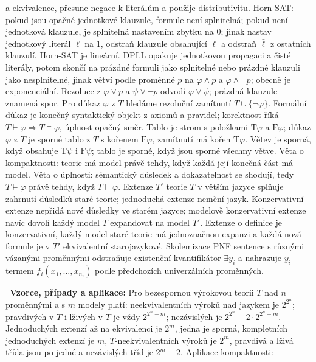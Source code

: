 \begin{odpoved}
a ekvivalence, přesune negace k literálům a použije distributivitu. Horn-SAT: pokud jsou
opačné jednotkové klauzule, formule není splnitelná; pokud není jednotková klauzule, je
splnitelná nastavením zbytku na $0$; jinak nastav jednotkový literál $\ell$ na $1$,
odstraň klauzule obsahující $\ell$ a odstraň $\bar\ell$ z ostatních klauzulí. Horn-SAT
je lineární. DPLL opakuje jednotkovou propagaci a čisté literály, potom skončí na prázdné
formuli jako splnitelné nebo prázdné klauzuli jako nesplnitelné, jinak větví podle proměnné
$p$ na $\varphi\land p$ a $\varphi\land\neg p$; obecně je exponenciální. Rezoluce z
$\varphi\lor p$ a $\psi\lor\neg p$ odvodí $\varphi\lor\psi$; prázdná klauzule znamená
spor. Pro důkaz $\varphi$ z $T$ hledáme rezoluční zamítnutí $T\cup\{\neg\varphi\}$.
Formální důkaz je konečný syntaktický objekt z axiomů a pravidel; korektnost říká
$T\vdash\varphi\Rightarrow T\models\varphi$, úplnost opačný směr. Tablo je strom s
položkami $\mathrm T\varphi$ a $\mathrm F\varphi$; důkaz $\varphi$ z $T$ je sporné
tablo z $T$ s kořenem $\mathrm F\varphi$, zamítnutí má kořen $\mathrm T\varphi$. Větev
je sporná, když obsahuje $\mathrm T\psi$ i $\mathrm F\psi$; tablo je sporné, když jsou
sporné všechny větve. Věta o kompaktnosti: teorie má model právě tehdy, když každá její
konečná část má model. Věta o úplnosti: sémantický důsledek a dokazatelnost se shodují,
tedy $T\models\varphi$ právě tehdy, když $T\vdash\varphi$. Extenze $T'$ teorie $T$ v
větším jazyce splňuje zahrnutí důsledků staré teorie; jednoduchá extenze nemění jazyk.
Konzervativní extenze nepřidá nové důsledky ve starém jazyce; modelově konzervativní extenze navíc dovolí každý model
$T$ expandovat na model $T'$. Extenze o definice je konzervativní, každý model staré
teorie má jednoznačnou expanzi a každá nová formule je v $T'$ ekvivalentní starojazykové.
Skolemizace PNF sentence s různými vázanými proměnnými odstraňuje existenční kvantifikátor
$\exists y_i$ a nahrazuje $y_i$ termem $f_i(x_1,\ldots,x_{n_i})$ podle předchozích
univerzálních proměnných.\par
\noindent{}\ \textbf{Vzorce, případy a aplikace:} Pro bezespornou výrokovou teorii
$T$ nad $n$ proměnnými a s $m$ modely platí: neekvivalentních výroků nad jazykem je
$2^{2^n}$; pravdivých v $T$ i lživých v $T$ je vždy $2^{2^n-m}$; nezávislých je
$2^{2^n}-2\cdot2^{2^n-m}$. Jednoduchých extenzí až na ekvivalenci je $2^m$, jedna je
sporná, kompletních jednoduchých extenzí je $m$, $T$-neekvivalentních výroků je $2^m$,
pravdivá a lživá třída jsou po jedné a nezávislých tříd je $2^m-2$. Aplikace kompaktnosti:

\end{odpoved}
